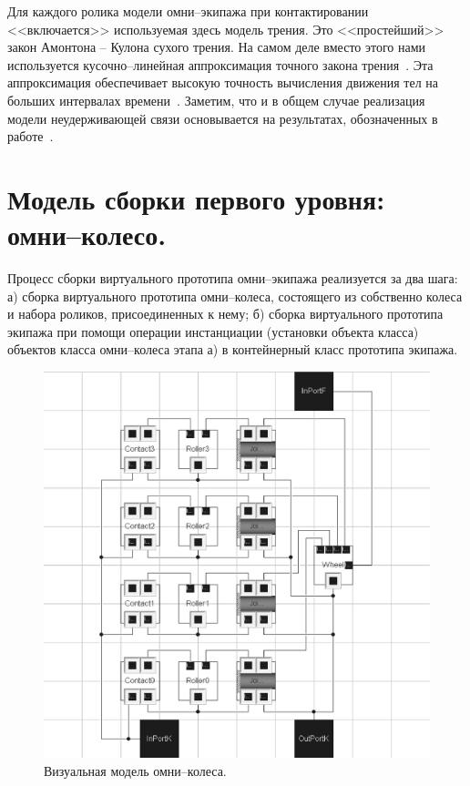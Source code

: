 \documentclass[12pt,a4paper]{article}
\begin{document}
Для каждого ролика модели омни--экипажа при контактировании <<включается>>
используемая здесь модель трения. Это <<простейший>> закон Амонтона -- Кулона
сухого трения. На самом деле вместо этого нами используется кусочно--линейная 
аппроксимация точного закона трения~\cite{Kosenko2006}. Эта аппроксимация 
обеспечивает высокую точность вычисления движения тел на больших интервалах 
времени~\cite{Novozhilov}. Заметим, что и в общем случае реализация модели 
неудерживающей связи основывается на результатах, обозначенных в 
работе~\cite{Kosenko2006}.

\section{Модель сборки первого уровня: омни--колесо.\ }
\label{sec4}
Процесс сборки виртуального прототипа омни--экипажа реализуется за два шага:
а) сборка виртуального прототипа омни--колеса, состоящего из собственно колеса
и набора роликов, присоединенных к нему; б) сборка виртуального прототипа
экипажа при помощи операции инстанциации (установки объекта класса) объектов 
класса омни--колеса этапа а) в контейнерный класс прототипа экипажа.

\begin{figure}[htb]
\centering\includegraphics[width=15cm]{OmniWheelModel.eps}
\caption{Визуальная модель омни--колеса.}
\label{OmniWheelModel}
\end{figure}
\end{document}
